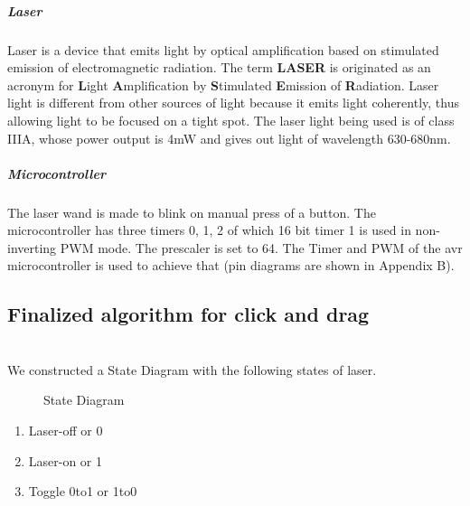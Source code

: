 \documentclass[12pt, a4paper]{article}
\begin{document}
{\subparagraph{Laser}

Laser is a device that emits light by optical amplification based on stimulated emission of electromagnetic radiation. The term \textbf{LASER} is originated as an acronym for \textbf{L}ight \textbf{A}mplification by \textbf{S}timulated \textbf{E}mission of \textbf{R}adiation. Laser light is different from other sources of light because it emits light coherently, thus allowing light to be focused on a tight spot. The laser light being used is of class IIIA, whose power output is 4mW and gives out light of wavelength 630-680nm. 

\subparagraph{Microcontroller}

The laser wand is made to blink on manual press of a button. The microcontroller has three timers 0, 1, 2 of which 16 bit timer 1 is used in non-inverting PWM mode. The prescaler is set to 64. The Timer and PWM of the avr microcontroller is used to achieve that (pin diagrams are shown in Appendix B).

\subsection{Finalized algorithm for click and drag}
~\\
	We constructed a State Diagram with the following states of laser.
	\begin{figure}
\centering
{}
\caption{State Diagram}
\end{figure}
\begin{enumerate}
\item Laser-off or 0
\item Laser-on or 1
\item Toggle 0to1 or 1to0 
\end{enumerate}

}
\end{document}
